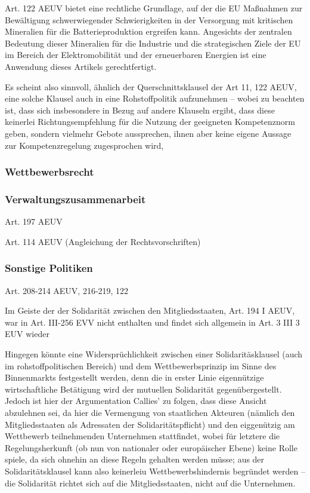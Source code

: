 \documentclass[12pt,a4paper,oneside]{book} %
\begin{document}
	Art. 122 AEUV bietet eine rechtliche Grundlage, auf der die EU Maßnahmen zur Bewältigung schwerwiegender Schwierigkeiten in der Versorgung mit kritischen Mineralien für die Batterieproduktion ergreifen kann. Angesichts der zentralen Bedeutung dieser Mineralien für die Industrie und die strategischen Ziele der EU im Bereich der Elektromobilität und der erneuerbaren Energien ist eine Anwendung dieses Artikels gerechtfertigt.
	
	Es scheint also sinnvoll, ähnlich der Querschnittsklausel der Art 11, 122 AEUV, eine solche Klausel auch in eine Rohstoffpolitik aufzunehmen -- wobei zu beachten ist, dass sich insbesondere in Bezug auf andere Klauseln ergibt, dass diese keinerlei Richtungsempfehlung für die Nutzung der geeigneten Kompetenznorm geben, sondern vielmehr Gebote aussprechen, ihnen aber keine eigene Aussage zur Kompetenzregelung zugesprochen wird,\autocite[39]{callies_umweltrecht_2022}
	
	
	\subsubsection{Wettbewerbsrecht}
	
	\subsubsection{Verwaltungszusammenarbeit}
	Art. 197 AEUV
	
	Art. 114 AEUV (Angleichung der Rechtsvorschriften)
	
	
	
	\subsubsection{Sonstige Politiken}
	Art. 208-214 AEUV, 216-219, 122
	
	Im Geiste der der Solidarität zwischen den Mitgliedsstaaten, Art. 194 I AEUV, war in Art. III-256 EVV nicht enthalten und findet sich allgemein in Art. 3 III 3 EUV wieder
	
	Hingegen könnte eine Widersprüchlichkeit zwischen einer Solidaritäsklausel (auch im rohstoffpolitischen Bereich) und dem Wettbewerbsprinzip im Sinne des Binnenmarkts festgestellt werden, denn die in erster Linie eigennützige wirtschaftliche Betätigung wird der mutuellen Solidarität gegenübergestellt.\autocite{Ehricke/Hackländer: ZEuS 2008, S. 579, 595f.} Jedoch ist hier der Argumentation Callies' zu folgen, dass diese Ansicht abzulehnen sei, da hier die Vermengung von staatlichen Akteuren (nämlich den Mitgliedsstaaten als Adressaten der Solidaritätspflicht) und den eiggenützig am Wettbewerb teilnehmenden Unternehmen stattfindet, wobei für letztere die Regelungsherkunft (ob nun von nationaler oder europäischer Ebene) keine Rolle spiele, da sich ohnehin an diese Regeln gehalten werden müsse; aus der Solidaritätsklausel kann also keinerleiu Wettbewerbshindernis begründet werden -- die Solidarität richtet sich auf die Mitgliedsstaaten, nicht auf die Unternehmen.
	
\end{document}
